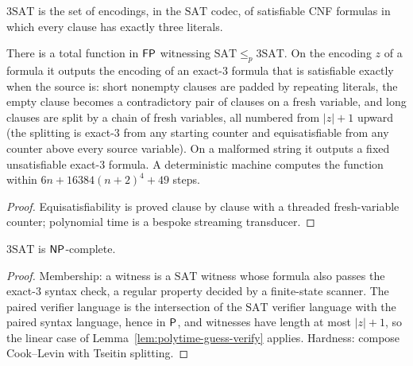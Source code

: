 \begin{definition}
  \label{def:polytime-3sat}
  \leanok
  $3\mathrm{SAT}$ is the set of encodings, in the $\mathrm{SAT}$ codec, of
  satisfiable CNF formulas in which every clause has exactly three literals.
\end{definition}

\begin{lemma}
  \label{lem:polytime-tseitin}
  \leanok
  There is a total function in $\mathsf{FP}$ witnessing
  $\mathrm{SAT} \le_p 3\mathrm{SAT}$. On the encoding $z$ of a formula it
  outputs the encoding of an exact-3 formula that is satisfiable exactly when
  the source is: short nonempty clauses are padded by repeating literals, the
  empty clause becomes a contradictory pair of clauses on a fresh variable, and
  long clauses are split by a chain of fresh variables, all numbered from
  $|z| + 1$ upward (the splitting is exact-3 from any starting counter and
  equisatisfiable from any counter above every source variable). On a
  malformed string it outputs a fixed unsatisfiable exact-3 formula. A
  deterministic machine computes the function within
  $6n + 16384(n + 2)^4 + 49$ steps.
\end{lemma}
\begin{proof}
  \leanok
  Equisatisfiability is proved clause by clause with a threaded
  fresh-variable counter; polynomial time is a bespoke streaming transducer.
\end{proof}

\begin{theorem}
  \label{thm:polytime-3sat-complete}
  \leanok
  $3\mathrm{SAT}$ is $\mathsf{NP}$-complete.
\end{theorem}
\begin{proof}
  \leanok
  Membership: a witness is a $\mathrm{SAT}$ witness whose formula also passes
  the exact-3 syntax check, a regular property decided by a finite-state
  scanner. The paired verifier language is the intersection of the
  $\mathrm{SAT}$ verifier language with the paired syntax language, hence in
  $\mathsf{P}$, and witnesses have length at most $|z| + 1$, so the linear case of
  Lemma~\ref{lem:polytime-guess-verify} applies. Hardness: compose
  Cook--Levin with Tseitin splitting.
\end{proof}

